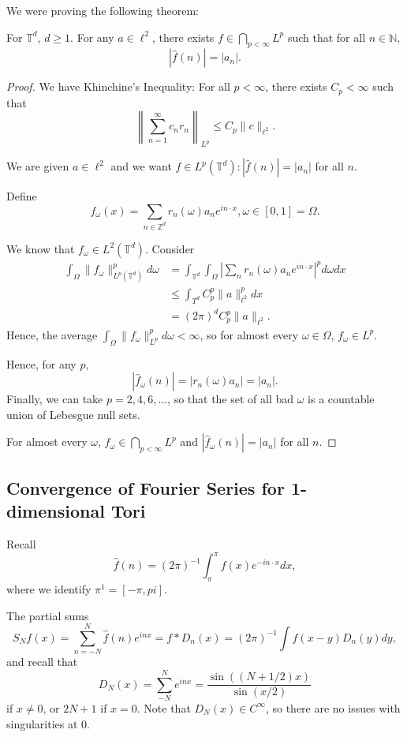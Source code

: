 \documentclass[11pt]{scrartcl}
\newcommand{\N}{\mathbb{N}}
\newcommand{\Z}{\mathbb{Z}}
\newcommand{\T}{\mathbb T}
\let \hat \widehat
\newcommand{\<}{\langle}
\renewcommand{\>}{\rangle}
\begin{document}
We were proving the following theorem:
\begin{thm} For $\T^d$, $d \ge 1$.  For any $a \in \ell^2$, there exists $f \in \bigcap_{p < \infty} L^p$ such that for all $n \in \N$,  $$|\hat{f}(n)| = |a_n|.$$
\end{thm}
\begin{proof}
We have Khinchine's Inequality: For all $p < \infty$, there exists $C_p < \infty$ such that 
$$\left \|\sum_{n=1}^{\infty} c_nr_n \right \|_{L^p} \le C_p \|c\|_{\ell^2}.$$

We are given $a \in \ell^2$ and we want $f \in L^p(\T^d): |\hat{f}(n)| = |a_n|$ for all $n$.

Define $$f_\omega(x) = \sum_{n \in \Z^d} r_{n}(\omega) a_n e^{in\cdot x}, \omega \in [0, 1] = \Omega.$$

We know that $f_\omega \in L^2(\T^d)$.  Consider
\begin{align*}
\int_\Omega \|f_\omega\|_{L^p(\T^d)}^p d\omega &= \int_{\T^d} \int_\Omega \left |\sum_{n} r_n(\omega) a_ne^{in \cdot x}\right |^pd\omega dx\\
&\le \int_{T^d} C_p^p \|a\|_{\ell^2}^p dx \\
&= (2\pi)^d C_p^p \|a\|_{\ell^2}.
\end{align*}
Hence, the average $\int_\Omega \|f_\omega\|^p_{L^p} d\omega < \infty$, so for almost every $\omega \in \Omega$, $f_\omega \in L^p$. 

Hence, for any $p$, 
$$|\hat{f}_\omega(n)| = |r_n(\omega) a_n| = |a_n|.$$
Finally, we can take $p = 2, 4, 6, \dots$, so that the set of all bad $\omega$ is a countable union of Lebesgue null sets.

For almost every $\omega$, $f_\omega \in \bigcap_{p < \infty} L^p$ and $|\hat{f}_\omega(n)| = |a_n|$ for all $n$.
\end{proof}
\subsection{Convergence of Fourier Series for 1-dimensional Tori}
Recall
$$\hat{f}(n) = (2\pi)^{-1} \int_{\pi}^\pi f(x)e^{-in\cdot x} dx,$$
where we identify $\pi^1 = [-\pi, pi]$.

The partial sums
$$S_N f(x) = \sum_{n = -N}^N \hat{f}(n) e^{inx} = f*D_n(x) = (2\pi)^{-1}\int f(x-y) D_n(y) dy,$$
and recall that
$$D_N(x) = \sum_{-N}^N e^{inx} = \frac{\sin((N + 1/2)x)}{\sin(x/2)}$$
if $x \ne 0$, or $2N+1$ if $x = 0$.  Note that $D_N(x) \in C^{\infty}$, so there are no issues with singularities at 0.
\end{document}
